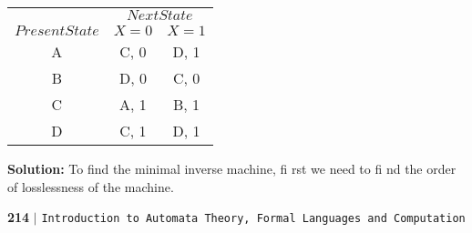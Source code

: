\documentclass{article}
\begin{document}
  
  \begin{center}
\begin{tabular}{ccc}
 \hline

 \hline

 \hline

 \hline
 & \multicolumn{2}{c}{$Next State$}\\
 \cline{2-3}
 $Present State$ &  $X=0$ & $X=1$\\
\hline
A & C, 0  &D, 1\\
B & D, 0  &C, 0\\
C & A, 1  &B, 1\\
D & C, 1  &D, 1\\
 \hline

 \hline

 \hline

 \hline
\end{tabular}
\end{center}

\vspace*{0.3cm}
\hspace*{0.5cm} \textbf{Solution:} To find the minimal inverse machine, fi rst we need to fi nd the order of losslessness of
the machine.\\

\newpage
\begin{flushleft}
    \textbf{214}\hspace*{0.1cm} \textbf{$|$} \hspace*{0.1cm} \texttt{Introduction to Automata Theory, Formal Languages and Computation}
  \end{flushleft}
\end{document}
